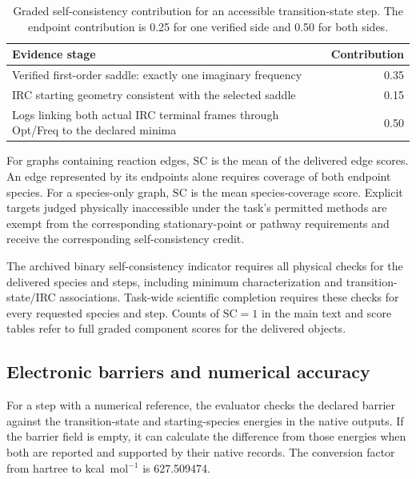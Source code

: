 \begin{table}[htbp]
\centering
\caption{Graded self-consistency contribution for an accessible transition-state step. The endpoint contribution is 0.25 for one verified side and 0.50 for both sides.}
\label{tab:si-self-consistency}
\small
\begin{tabular}{p{}r}
\toprule
Evidence stage & Contribution \\
\midrule
Verified first-order saddle: exactly one imaginary frequency & 0.35 \\
IRC starting geometry consistent with the selected saddle & 0.15 \\
Logs linking both actual IRC terminal frames through Opt/Freq to the declared minima & 0.50 \\
\bottomrule
\end{tabular}
\end{table}

For graphs containing reaction edges, $\mathrm{SC}$ is the mean of the delivered edge scores. An edge represented by its endpoints alone requires coverage of both endpoint species. For a species-only graph, $\mathrm{SC}$ is the mean species-coverage score. Explicit targets judged physically inaccessible under the task's permitted methods are exempt from the corresponding stationary-point or pathway requirements and receive the corresponding self-consistency credit.

The archived binary self-consistency indicator requires all physical checks for the delivered species and steps, including minimum characterization and transition-state/IRC associations. Task-wide scientific completion requires these checks for every requested species and step. Counts of $\mathrm{SC}=1$ in the main text and score tables refer to full graded component scores for the delivered objects.

\subsection{Electronic barriers and numerical accuracy}
For a step with a numerical reference, the evaluator checks the declared barrier against the transition-state and starting-species energies in the native outputs. If the barrier field is empty, it can calculate the difference from those energies when both are reported and supported by their native records. The conversion factor from hartree to kcal~mol$^{-1}$ is 627.509474.

